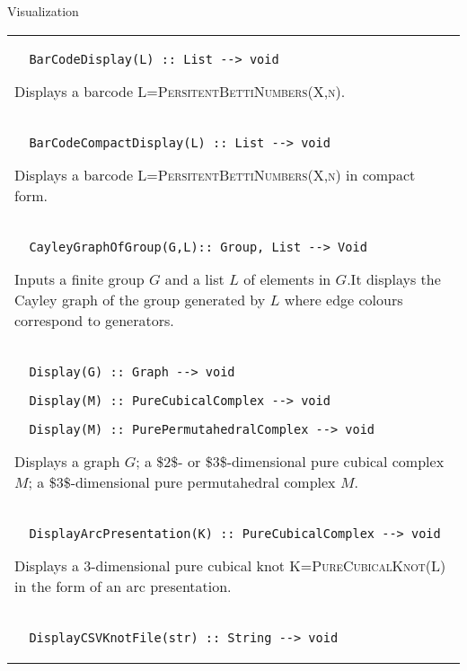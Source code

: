 \documentclass[a4paper,11pt]{report}
\begin{document}
{ Visualization \begin{center}
\begin{tabular}{|l|} \index{BarCodeDisplay} 
\begin{verbatim}  BarCodeDisplay(L) :: List --> void
\end{verbatim}


 

Displays a barcode \textsc{L=PersitentBettiNumbers(X,n)}. \\
 \index{BarCodeCompactDisplay} 
\begin{verbatim}  BarCodeCompactDisplay(L) :: List --> void
\end{verbatim}


 

Displays a barcode \textsc{L=PersitentBettiNumbers(X,n)} in compact form. \\
 \index{CayleyGraphOfGroupDisplay} 
\begin{verbatim}  CayleyGraphOfGroup(G,L):: Group, List --> Void
\end{verbatim}


 

 Inputs a finite group $G$ and a list $L$ of elements in $G$.It displays the Cayley graph of the group generated by $L$ where edge colours correspond to generators. \\
 \index{Display} 
\begin{verbatim}  Display(G) :: Graph --> void
\end{verbatim}
 
\begin{verbatim}  Display(M) :: PureCubicalComplex --> void
\end{verbatim}
 
\begin{verbatim}  Display(M) :: PurePermutahedralComplex --> void
\end{verbatim}


 

Displays a graph $G$; a \$2\$- or \$3\$-dimensional pure cubical complex $M$; a \$3\$-dimensional pure permutahedral complex $M$. \\
 \index{DisplayArcPresentation} 
\begin{verbatim}  DisplayArcPresentation(K) :: PureCubicalComplex --> void
\end{verbatim}


 

Displays a $3$-dimensional pure cubical knot \textsc{K=PureCubicalKnot(L)} in the form of an arc presentation. \\
 \index{DisplayCSVknotFile} 
\begin{verbatim}  DisplayCSVKnotFile(str) :: String --> void
\end{verbatim}



\end{tabular}
\end{center}}
\end{document}
